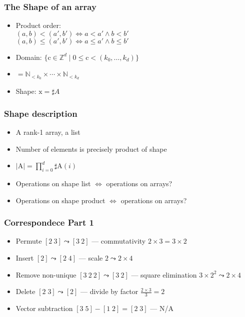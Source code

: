 \documentclass[xetex,mathserif,serif]{beamer}
\newcommand\mrm[1]{\mathrm{#1}}
\newcommand\brm[1]{\bm{\mrm{#1}}}
\newcommand\Nat{\mathbb{N}}
\newcommand\Zheil{\mathbb{Z}}
\begin{document}
\begin{frame}
  \frametitle{The Shape of an array}
  \begin{itemize}%
    \item Product order:\\
      \((a, b) < (a', b') \iff a < a' \land b < b'\)\\
      \((a, b) \le (a', b') \iff a \le a' \land b \le b'\)
    \item Domain: \(\{\brm c \in \Zheil^d \mid \brm 0 \le \brm c < (k_0,\dots,k_d)\}\)
    \item \(= \Nat_{<k_0} \times \cdots \times \Nat_{<k_d}\)
    \item Shape: \(\brm x = \sharp A\)
  \end{itemize}
\end{frame}

\begin{frame}
  \frametitle{Shape description}
  \begin{itemize}%
    \item A rank-1 array, a list
    \item Number of elements is precisely product of shape
    \item \(|\brm A| = \prod_{i=0}^d \sharp \brm A (i)\)
    \item Operations on shape list \(\iff\) operations on arrays?
    \item Operations on shape product \(\iff\) operations on arrays?
  \end{itemize}
\end{frame}

\begin{frame}
  \frametitle{Correspondece Part 1}
  \begin{itemize}%
    \item Permute \([2\ 3] \leadsto [3\ 2]\) --- 
    commutativity \(2\times3 = 3\times2\)
    \item Insert \([2] \leadsto [2\;4]\) --- scale \(2\leadsto 2\times 4\)
    \item Remove non-unique \([3\ 2\ 2] \leadsto [3\ 2]\) ---
    square elimination \(3\times 2^2 \leadsto 2\times 4\)
    \item Delete \([2\;3] \leadsto [2]\) --- divide by factor \(\frac{2\times3}3 = 2\)
    \item Vector subtraction \( [3\;5] - [1\;2] = [2\;3] \) --- N/A
  \end{itemize}
\end{frame}
\end{document}
